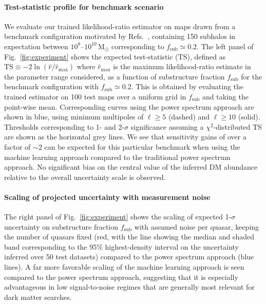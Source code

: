 \documentclass[preprint]{article}
\begin{document}
\paragraph{Test-statistic profile for benchmark scenario} We evaluate our trained likelihood-ratio estimator on maps drawn from a benchmark configuration motivated by Refs.~\cite{Hutten:2016jko,Springel:2008cc}, containing 150 subhalos in expectation between $10^{8}$--$10^{10}\,\mathrm{M}_\odot$ corresponding to $f_\mathrm{sub} \simeq 0.2$. The left panel of Fig.~\ref{fig:experiment} shows the expected test-statistic (TS), defined as $\mathrm{TS} \equiv -2\ln(\hat r / \hat r_\mathrm{max})$ where $\hat r_\mathrm{max}$ is the maximum likelihood-ratio estimate in the parameter range considered, as a function of substructure fraction $f_\mathrm{sub}$ for the benchmark configuration with $f_\mathrm{sub} \simeq 0.2$. This is obtained by evaluating the trained estimator on 100 test maps over a uniform grid in $f_\mathrm{sub}$ and taking the point-wise mean. Corresponding curves using the power spectrum approach are shown in blue, using minimum multipoles of $\ell \geq 5$ (dashed) and $\ell \geq 10$ (solid). Thresholds corresponding to 1- and 2-$\sigma$ significance assuming a $\chi^2$-distributed TS are shown as the horizontal grey lines. We see that sensitivity gains of over a factor of $\sim 2$ can be expected for this particular benchmark when using the machine learning approach compared to the traditional power spectrum approach. No significant bias on the central value of the inferred DM abundance relative to the overall uncertainty scale is observed.

\paragraph{Scaling of projected uncertainty with measurement noise} The right panel of Fig.~\ref{fig:experiment} shows the scaling of expected 1-$\sigma$ uncertainty on substructure fraction $f_\mathrm{sub}$ with assumed noise per quasar, keeping the number of quasars fixed (red, with the line showing the median and shaded band corresponding to the 95\% highest-density interval on the uncertainty inferred over 50 test datasets) compared to the power spectrum approach (blue lines). A far more favorable scaling of the machine learning approach is seen compared to the power spectrum approach, suggesting that it is especially advantageous in low signal-to-noise regimes that are generally most relevant for dark matter searches.
\end{document}
